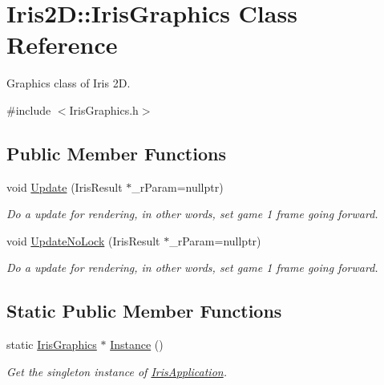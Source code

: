 \hypertarget{class_iris2_d_1_1_iris_graphics}{}\section{Iris2D\+:\+:Iris\+Graphics Class Reference}
\label{class_iris2_d_1_1_iris_graphics}


Graphics class of Iris 2D.  




{\ttfamily \#include $<$Iris\+Graphics.\+h$>$}

\subsection*{Public Member Functions}
\begin{DoxyCompactItemize}
\item 
void \hyperlink{class_iris2_d_1_1_iris_graphics_aa25debfc9a08d7084f48711a6bffdc4d}{Update} (Iris\+Result $\ast$\+\_\+r\+Param=nullptr)
\begin{DoxyCompactList}\small\item\em Do a update for rendering, in other words, set game 1 frame going forward. \end{DoxyCompactList}\item 
void \hyperlink{class_iris2_d_1_1_iris_graphics_adbbca919748bfdd9b84958414debc588}{Update\+No\+Lock} (Iris\+Result $\ast$\+\_\+r\+Param=nullptr)
\begin{DoxyCompactList}\small\item\em Do a update for rendering, in other words, set game 1 frame going forward. \end{DoxyCompactList}\end{DoxyCompactItemize}
\subsection*{Static Public Member Functions}
\begin{DoxyCompactItemize}
\item 
\mbox{\label{class_iris2_d_1_1_iris_graphics_a25533fd69478336d60c5b1f639802d3a}} 
static \hyperlink{class_iris2_d_1_1_iris_graphics}{Iris\+Graphics} $\ast$ \hyperlink{class_iris2_d_1_1_iris_graphics_a25533fd69478336d60c5b1f639802d3a}{Instance} ()
\begin{DoxyCompactList}\small\item\em Get the singleton instance of \hyperlink{class_iris2_d_1_1_iris_application}{Iris\+Application}. \end{DoxyCompactList}\end{DoxyCompactItemize}



